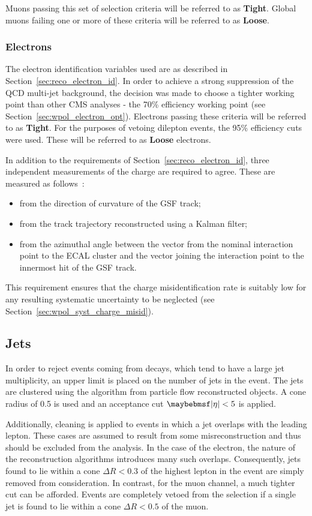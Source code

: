 Muons passing this set of selection criteria will be referred to as
\textbf{Tight}. Global muons failing one or more of these criteria will be
referred to as \textbf{Loose}.

\subsubsection{Electrons}
\label{sec:wpol_electronid}
The electron identification variables used are as described in
Section~\ref{sec:reco_electron_id}. In order to achieve a strong suppression of
the \ac{QCD} multi-jet background, the decision was made to choose a tighter
working point than other \ac{CMS} analyses - the 70\% efficiency working point
(see Section~\ref{sec:wpol_electron_opt}). Electrons passing these criteria will
be referred to as \textbf{Tight}. For the purposes of vetoing dilepton events,
the 95\% efficiency cuts were used. These will be referred to as \textbf{Loose}
electrons.

In addition to the requirements of Section~\ref{sec:reco_electron_id}, three independent
measurements of the charge are required to agree. These are measured as follows~\cite{wcharge_asymm2}:
\begin{itemize}
\item from the direction of curvature of the \ac{GSF} track;
\item from the track trajectory reconstructed using a Kalman filter;
\item from the azimuthal angle between the vector from the nominal interaction
  point to the \ac{ECAL} cluster and the vector joining the interaction point to
  the innermost hit of the \ac{GSF} track.
\end{itemize}
This requirement ensures that the charge misidentification rate is suitably low
for any resulting systematic uncertainty to be neglected (see
Section~\ref{sec:wpol_syst_charge_misid}).

\subsection{Jets}
\label{sec:wpol_jets}
In order to reject events coming from \ttbar decays, which tend to have a large
jet multiplicity, an upper limit is placed on the number of jets in the
event. The jets are clustered using the \antikT algorithm from particle flow
reconstructed objects. A cone radius of 0.5 is used and an acceptance cut
$\modeta < 5$ is applied.

Additionally, cleaning is applied to events in which a jet overlaps with the
leading lepton. These cases are assumed to result from some misreconstruction
and thus should be excluded from the analysis. In the case of the electron, the
nature of the reconstruction algorithms introduces many such
overlaps. Consequently, jets found to lie within a cone $\Delta R < 0.3$ of the
highest \Pt lepton in the event are simply removed from consideration. In
contrast, for the muon channel, a much tighter cut can be afforded. Events are
completely vetoed from the selection if a single jet is found to lie within a
cone $\Delta R < 0.5$ of the muon.

